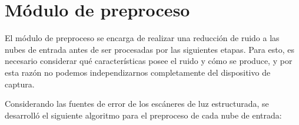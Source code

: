 \section{Módulo de preproceso}
El módulo de preproceso se encarga de realizar una reducción de ruido a las nubes de entrada
antes de ser procesadas por las siguientes etapas.
Para esto, es necesario considerar qué características posee el ruido y cómo se produce,
y por esta razón no podemos independizarnos completamente del dispositivo de captura.

Considerando las fuentes de error de los escáneres de luz estructurada, se desarrolló
el siguiente algoritmo para el preproceso de cada nube de entrada:
